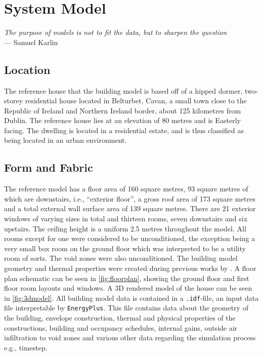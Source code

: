 \chapter{System Model}\label{ch:model} 

\begin{flushright}{\slshape
    The purpose of models is not to fit the data, but to sharpen the question} \\ \medskip
    --- Samuel Karlin
\end{flushright}

\section{Location}
The reference house that the building model is based off of a hipped dormer, two-storey residential house located in Belturbet, Cavan, a small town close to the Republic of Ireland and Northern Ireland border, about 125 kilometres from Dublin. The reference house lies at an elevation of 80 metres and is Easterly facing. The dwelling is located in a residential estate, and is thus classified as being located in an urban environment.

\section{Form and Fabric}
The reference model has a floor area of 160 square metres, 93 square metres of which are downstairs, i.e., ``exterior floor'', a gross roof area of 173 square metres and a total external wall surface area of 139 square metres. There are 21 exterior windows of varying sizes in total and thirteen rooms, seven downstairs and six upstairs. The ceiling height is a uniform 2.5 metres throughout the model. All rooms except for one were considered to be unconditioned, the exception being a very small box room on the ground floor which was interpreted to be a utility room of sorts. The void zones were also unconditioned. The building model geometry and thermal properties were created during previous works by \citeauthor{keogh_technical_2022}. A floor plan schematic can be seen in \cref{fig:floorplan}, showing the ground floor and first floor room layouts and windows. A 3D rendered model of the house can be seen in \cref{fig:3dmodel}. All building model data is contained in a \texttt{.idf}-file, an input data file interpretable by \texttt{EnergyPlus}. This file contains data about the geometry of the building, envelope construction, thermal and physical properties of the constructions, building and occupancy schedules, internal gains, outside air infiltration to void zones and various other data regarding the simulation process e.g., timestep. 

